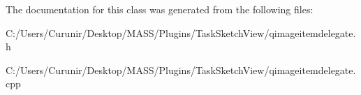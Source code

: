 The documentation for this class was generated from the following files\+:\begin{DoxyCompactItemize}
\item 
C\+:/\+Users/\+Curunir/\+Desktop/\+M\+A\+S\+S/\+Plugins/\+Task\+Sketch\+View/qimageitemdelegate.\+h\item 
C\+:/\+Users/\+Curunir/\+Desktop/\+M\+A\+S\+S/\+Plugins/\+Task\+Sketch\+View/qimageitemdelegate.\+cpp\end{DoxyCompactItemize}
